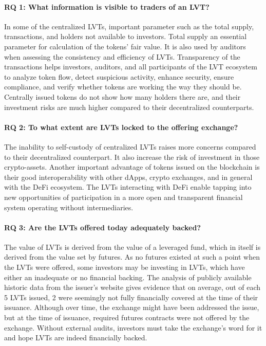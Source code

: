 \paragraph{RQ 1: What information is visible to traders of an LVT?} In some of the centralized LVTs, important parameter such as the total supply, transactions, and holders not available to investors. Total supply an essential parameter for calculation of the tokens' fair value. It is also used by auditors when assessing the consistency and efficiency of LVTs. Transparency of the transactions helps investors, auditors, and all participants of the LVT ecosystem to analyze token flow, detect suspicious activity, enhance security, ensure compliance, and verify whether tokens are working the way they should be. Centrally issued tokens do not show how many holders there are, and their investment risks are much higher compared to their decentralized counterparts.

\paragraph{RQ 2: To what extent are LVTs locked to the offering exchange?} The inability to self-custody of centralized LVTs raises more concerns compared to their decentralized counterpart. It also increase the risk of investment in those crypto-assets. Another important advantage of tokens issued on the blockchain is their good interoperability with other dApps, crypto exchanges, and in general with the DeFi ecosystem. The LVTs interacting with DeFi enable tapping into new opportunities of participation in a more open and transparent financial system operating without intermediaries.
	
\paragraph{RQ 3: Are the LVTs offered today adequately backed?} The value of LVTs is derived from the value of a leveraged fund, which in itself is derived from the value set by futures. As no futures existed at such a point when the LVTs were offered, some investors may be investing in LVTs, which have either an inadequate or no financial backing. The analysis of publicly available historic data from the issuer's website gives evidence that on average, out of each 5 LVTs issued, 2 were seemingly not fully financially covered at the time of their issuance. Although over time, the exchange might have been addressed the issue, but at the time of issuance, required futures contracts were not offered by the exchange. Without external audits, investors must take the exchange's word for it and hope LVTs are indeed financially backed.
	
